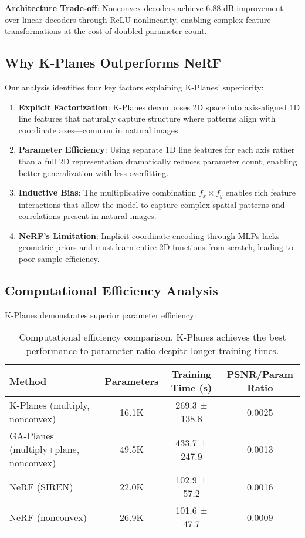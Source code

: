 \documentclass{article}
\begin{document}
\textbf{Architecture Trade-off}: Nonconvex decoders achieve 6.88 dB improvement over linear decoders through ReLU nonlinearity, enabling complex feature transformations at the cost of doubled parameter count.

\subsection{Why K-Planes Outperforms NeRF}

Our analysis identifies four key factors explaining K-Planes' superiority:

\begin{enumerate}
\item \textbf{Explicit Factorization}: K-Planes decomposes 2D space into axis-aligned 1D line features that naturally capture structure where patterns align with coordinate axes—common in natural images.

\item \textbf{Parameter Efficiency}: Using separate 1D line features for each axis rather than a full 2D representation dramatically reduces parameter count, enabling better generalization with less overfitting.

\item \textbf{Inductive Bias}: The multiplicative combination $f_x \times f_y$ enables rich feature interactions that allow the model to capture complex spatial patterns and correlations present in natural images.

\item \textbf{NeRF's Limitation}: Implicit coordinate encoding through MLPs lacks geometric priors and must learn entire 2D functions from scratch, leading to poor sample efficiency.
\end{enumerate}

\subsection{Computational Efficiency Analysis}

K-Planes demonstrates superior parameter efficiency:

\begin{table}[t]
\centering
\small
\begin{tabular}{@{}lccc@{}}
\toprule
\textbf{Method} & \textbf{Parameters} & \textbf{Training Time (s)} & \textbf{PSNR/Param Ratio} \\
\midrule
K-Planes (multiply, nonconvex) & 16.1K & 269.3 ± 138.8 & 0.0025 \\
GA-Planes (multiply+plane, nonconvex) & 49.5K & 433.7 ± 247.9 & 0.0013 \\
NeRF (SIREN) & 22.0K & 102.9 ± 57.2 & 0.0016 \\
NeRF (nonconvex) & 26.9K & 101.6 ± 47.7 & 0.0009 \\
\bottomrule
\end{tabular}
\caption{Computational efficiency comparison. K-Planes achieves the best performance-to-parameter ratio despite longer training times.}
\label{tab:efficiency}
\end{table}
\end{document}
